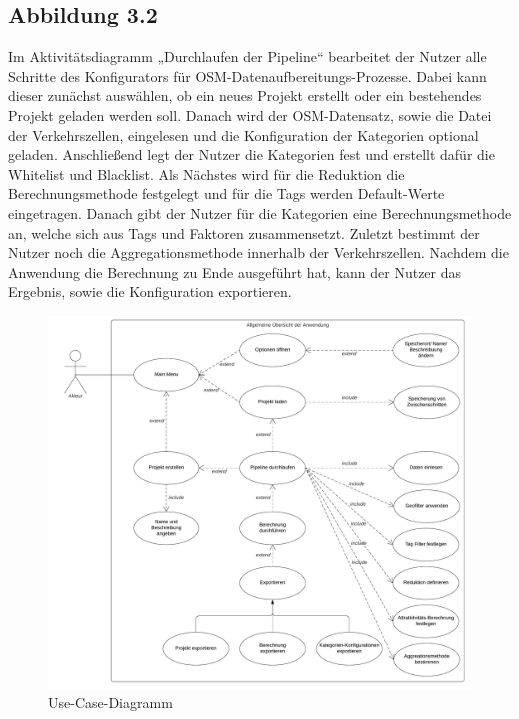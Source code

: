 \documentclass[parskip=full]{scrartcl} %
\begin{document}
\subsection*{Abbildung 3.2}
Im Aktivitätsdiagramm „Durchlaufen der Pipeline“ bearbeitet der Nutzer alle Schritte des Konfigurators für OSM-Datenaufbereitungs-Prozesse. Dabei kann dieser zunächst auswählen, ob ein neues Projekt erstellt oder ein bestehendes Projekt geladen werden soll. Danach wird der OSM-Datensatz, sowie die Datei der Verkehrszellen, eingelesen und die Konfiguration der Kategorien optional geladen. Anschließend legt der Nutzer die Kategorien fest und erstellt dafür die Whitelist und Blacklist. Als Nächstes wird für die Reduktion die Berechnungsmethode festgelegt und für die Tags werden Default-Werte eingetragen. Danach gibt der Nutzer für die Kategorien eine Berechnungsmethode an, welche sich aus Tags und Faktoren zusammensetzt. Zuletzt bestimmt der Nutzer noch die Aggregationsmethode innerhalb der Verkehrszellen. Nachdem die Anwendung die Berechnung zu Ende ausgeführt hat, kann der Nutzer das Ergebnis, sowie die Konfiguration exportieren. 
\begin{figure}
    \centering
    \includegraphics[width=1\textwidth,cfbox=black 1pt 0pt]{pictures/Anwendungsfalldiagramm.png}
    \caption{Use-Case-Diagramm}
\end{figure}
\end{document}
